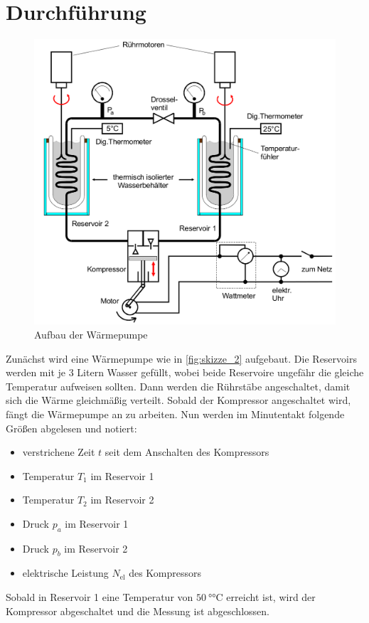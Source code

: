 \section{Durchführung}
\label{sec:Durchführung}


\begin{figure}
    \centering
    \includegraphics[width=\textwidth/2]{images/skizze_2.png}
    \caption{Aufbau der Wärmepumpe\cite{V206}}
    \label{fig:skizze_2}
\end{figure}

Zunächst wird eine Wärmepumpe wie in \autoref{fig:skizze_2} aufgebaut.
Die Reservoirs werden mit je 3 Litern Wasser gefüllt, wobei beide Reservoire ungefähr die gleiche Temperatur aufweisen sollten.
Dann werden die Rührstäbe angeschaltet, damit sich die Wärme gleichmäßig verteilt.
Sobald der Kompressor angeschaltet wird, fängt die Wärmepumpe an zu arbeiten.
Nun werden im Minutentakt folgende Größen abgelesen und notiert:
\begin{itemize}
    \item verstrichene Zeit $t$ seit dem Anschalten des Kompressors
    \item Temperatur $T_1$ im Reservoir 1
    \item Temperatur $T_2$ im Reservoir 2
    \item Druck $p_a$ im Reservoir 1
    \item Druck $p_b$ im Reservoir 2
    \item elektrische Leistung $N_\text{el}$ des Kompressors
\end{itemize}

Sobald in Reservoir 1 eine Temperatur von $\SI{50}{\degree\celsius}$ erreicht ist, wird der Kompressor abgeschaltet und die Messung ist abgeschlossen.
